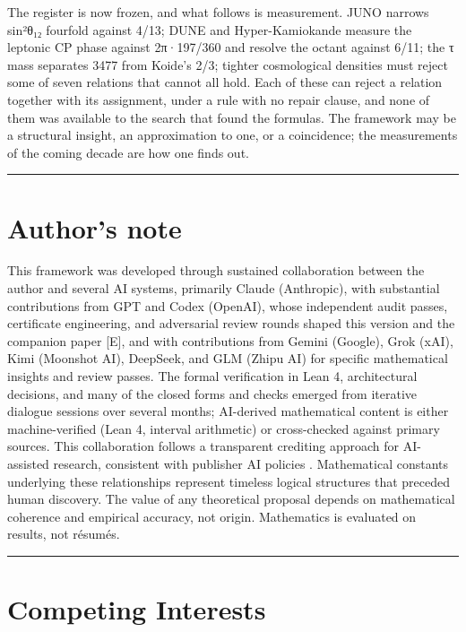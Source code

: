 \documentclass[11pt,a4paper]{article}
\begin{document}
The register is now frozen, and what follows is measurement. JUNO narrows sin²θ₁₂ fourfold against 4/13; DUNE and Hyper-Kamiokande measure the leptonic CP phase against 2π·197/360 and resolve the octant against 6/11; the τ mass separates 3477 from Koide's 2/3; tighter cosmological densities must reject some of seven relations that cannot all hold. Each of these can reject a relation together with its assignment, under a rule with no repair clause, and none of them was available to the search that found the formulas. The framework may be a structural insight, an approximation to one, or a coincidence; the measurements of the coming decade are how one finds out.

\begin{center}\rule{\linewidth}{0.5pt}\end{center}

\section{Author's note}\label{authors-note}

This framework was developed through sustained collaboration between the author and several AI systems, primarily Claude (Anthropic), with substantial contributions from GPT and Codex (OpenAI), whose independent audit passes, certificate engineering, and adversarial review rounds shaped this version and the companion paper {[}E{]}, and with contributions from Gemini (Google), Grok (xAI), Kimi (Moonshot AI), DeepSeek, and GLM (Zhipu AI) for specific mathematical insights and review passes. The formal verification in Lean 4, architectural decisions, and many of the closed forms and checks emerged from iterative dialogue sessions over several months; AI-derived mathematical content is either machine-verified (Lean 4, interval arithmetic) or cross-checked against primary sources. This collaboration follows a transparent crediting approach for AI-assisted research, consistent with publisher AI policies \cite{38}. Mathematical constants underlying these relationships represent timeless logical structures that preceded human discovery. The value of any theoretical proposal depends on mathematical coherence and empirical accuracy, not origin. Mathematics is evaluated on results, not résumés.

\begin{center}\rule{\linewidth}{0.5pt}\end{center}

\section{Competing Interests}\label{competing-interests}
\end{document}
